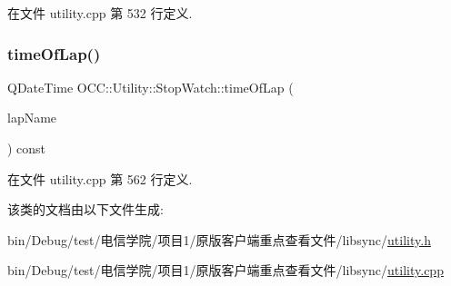 在文件 utility.\+cpp 第 532 行定义.

\mbox{\label{class_o_c_c_1_1_utility_1_1_stop_watch_a2469e4be115083023be93a579e66e1f7}} 
\subsubsection{\texorpdfstring{time\+Of\+Lap()}{timeOfLap()}}
{\footnotesize\ttfamily Q\+Date\+Time O\+C\+C\+::\+Utility\+::\+Stop\+Watch\+::time\+Of\+Lap (\begin{DoxyParamCaption}\item[{const Q\+String \&}]{lap\+Name }\end{DoxyParamCaption}) const}



在文件 utility.\+cpp 第 562 行定义.



该类的文档由以下文件生成\+:\begin{DoxyCompactItemize}
\item 
bin/\+Debug/test/电信学院/项目1/原版客户端重点查看文件/libsync/\hyperlink{utility_8h}{utility.\+h}\item 
bin/\+Debug/test/电信学院/项目1/原版客户端重点查看文件/libsync/\hyperlink{utility_8cpp}{utility.\+cpp}\end{DoxyCompactItemize}
